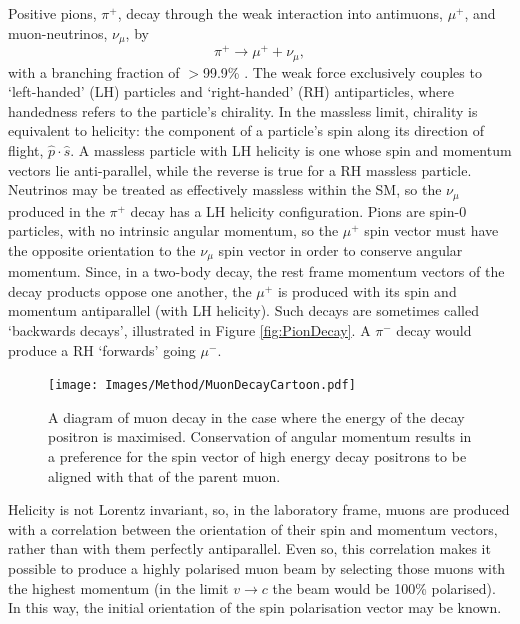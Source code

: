 Positive pions, $\pi^{+}$, decay through the weak interaction into antimuons, $\mu^{+}$, and muon-neutrinos, $\nu_{\mu}$, by 
%
\begin{equation}
  \pi^{+}\rightarrow\mu^{+}+\nu_{\mu},
  \label{eqn:PionDecay}
\end{equation}
%
with a branching fraction of $>$99.9\% \cite{PDG2018}. The weak force exclusively couples to `left-handed' (LH) particles and `right-handed' (RH) antiparticles, where handedness refers to the particle's chirality. In the massless limit, chirality is equivalent to helicity: the component of a particle's spin along its direction of flight, $\hat{p}\cdot\hat{s}$.  A massless particle with LH helicity is one whose spin and momentum vectors lie anti-parallel, while the reverse is true for a RH massless particle. Neutrinos may be treated as effectively massless within the SM, so the $\nu_{\mu}$ produced in the $\pi^{+}$ decay has a LH helicity configuration. Pions are spin-0 particles, with no intrinsic angular momentum, so the $\mu^{+}$ spin vector must have the opposite orientation to the $\nu_{\mu}$ spin vector in order to conserve angular momentum. Since, in a two-body decay, the rest frame momentum vectors of the decay products oppose one another, the $\mu^{+}$ is produced with its spin and momentum antiparallel (with LH helicity). Such decays are sometimes called `backwards decays', illustrated in Figure \ref{fig:PionDecay}. A $\pi^{-}$ decay would produce a RH `forwards' going $\mu^{-}$.

\begin{figure}[t!]
\centering{}
\texttt{[image: Images/Method/MuonDecayCartoon.pdf]}
\caption{A diagram of muon decay in the case where the energy of the decay positron is maximised. Conservation of angular momentum results in a preference for the spin vector of high energy decay positrons to be aligned with that of the parent muon.}
\label{fig:MuonDecay}
\end{figure}

Helicity is not Lorentz invariant, so, in the laboratory frame, muons are produced with a correlation between the orientation of their spin and momentum vectors, rather than with them perfectly antiparallel. Even so, this correlation makes it possible to produce a highly polarised muon beam by selecting those muons with the highest momentum (in the limit $v\rightarrow c$ the beam would be 100\% polarised). In this way, the initial orientation of the spin polarisation vector may be known. 

